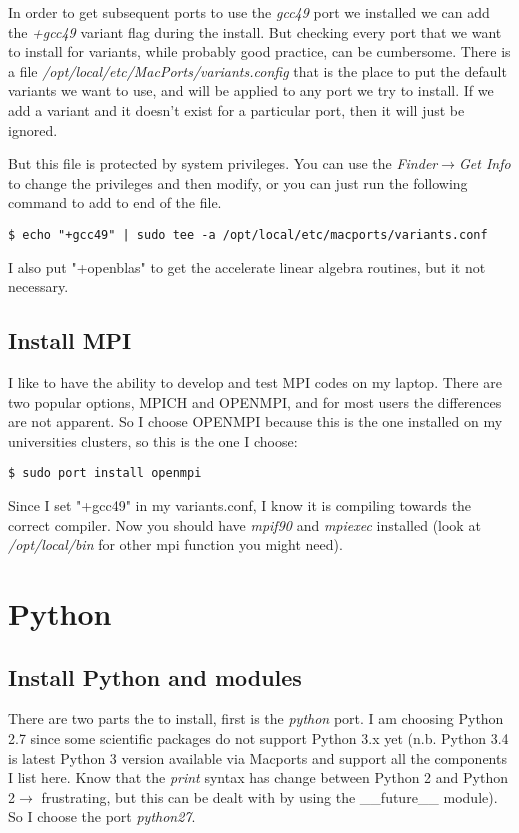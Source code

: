 \documentclass[11pt]{article}
\begin{document}
In order to get subsequent ports to use the \textit{gcc49} port we installed we can add the \textit{+gcc49} variant flag during the install. But checking every port that we want to install for variants, while probably good practice, can be cumbersome. There is a file \textit{/opt/local/etc/MacPorts/variants.config} that is the place to put the default variants we want to use, and will be applied to any port we try to install. If we add a variant and it doesn't exist for a particular port, then it will just be ignored.  

But this file is protected by system privileges. You can use the \textit{Finder$\rightarrow$Get Info} to change the privileges and then modify, or you can just run the following command to add to end of the file.
\begin{lstlisting}[style=Bash]
$ echo "+gcc49" | sudo tee -a /opt/local/etc/macports/variants.conf
\end{lstlisting}
I also put "+openblas" to get the accelerate linear algebra routines, but it not necessary.


\subsection{Install MPI}
I like to have the ability to develop and test MPI codes on my laptop. There are two popular options, MPICH and OPENMPI, and for most users the differences are not apparent. So I choose OPENMPI because this is the one installed on my universities clusters, so this is the one I choose:
\begin{lstlisting}[style=Bash]
$ sudo port install openmpi
\end{lstlisting}
Since I set "+gcc49" in my variants.conf, I know it is compiling towards the correct compiler. Now you should have \textit{mpif90} and \textit{mpiexec} installed (look at \textit{/opt/local/bin} for other mpi function you might need).



%
%
\section{Python}
\subsection{Install Python and modules}
There are two parts the to install, first is the \textit{python} port.  I am choosing Python 2.7 since some scientific packages do not support Python 3.x yet (n.b. Python 3.4 is latest Python 3 version available via Macports and support all the components I list here. Know that the  \textit{print} syntax has change between Python 2 and Python 2$\rightarrow$ frustrating, but this can be dealt with by using the \_\_future\_\_ module). So I choose the port \textit{python27}. 
\end{document}
